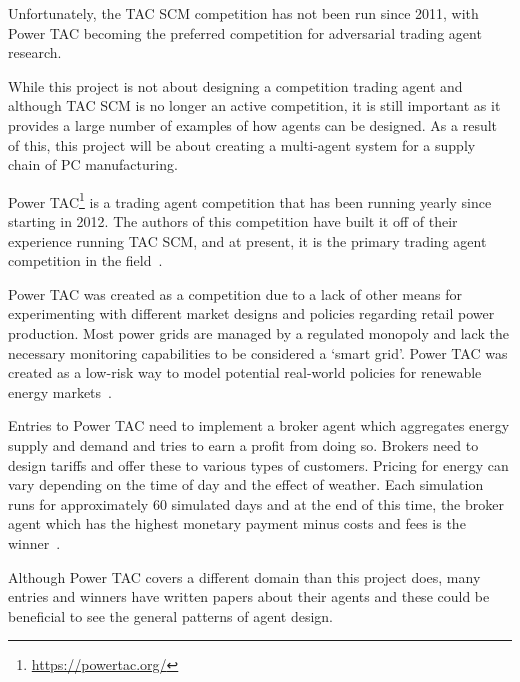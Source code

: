 Unfortunately, the TAC SCM competition has not been run since 2011, with Power TAC becoming the preferred competition for adversarial trading agent research.

While this project is not about designing a competition trading agent and although TAC SCM is no longer an active competition, it is still important as it provides a large number of examples of how agents can be designed.
As a result of this, this project will be about creating a multi-agent system for a supply chain of PC manufacturing.

Power TAC\footnote{\url{https://powertac.org/}} is a trading agent competition that has been running yearly since starting in 2012.
The authors of this competition have built it off of their experience running TAC SCM, and at present, it is the primary trading agent competition in the field~\cite{ketter2013power}.

Power TAC was created as a competition due to a lack of other means for experimenting with different market designs and policies regarding retail power production.
Most power grids are managed by a regulated monopoly and lack the necessary monitoring capabilities to be considered a `smart grid'.
Power TAC was created as a low-risk way to model potential real-world policies for renewable energy markets~\cite{ketter2013power}.

Entries to Power TAC need to implement a broker agent which aggregates energy supply and demand and tries to earn a profit from doing so.
Brokers need to design tariffs and offer these to various types of customers.
Pricing for energy can vary depending on the time of day and the effect of weather.
Each simulation runs for approximately 60 simulated days and at the end of this time, the broker agent which has the highest monetary payment minus costs and fees is the winner~\cite{ketter2020power}.

Although Power TAC covers a different domain than this project does, many entries and winners have written papers about their agents and these could be beneficial to see the general patterns of agent design.
